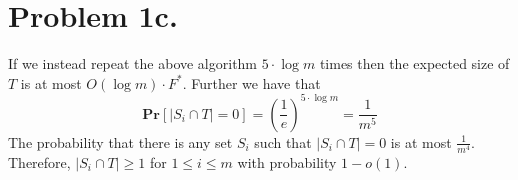 \documentclass[12pt]{article}
\begin{document}
\section*{Problem 1c.}
If we instead repeat the above algorithm $5 \cdot \log m$ times then the
expected size of $T$ is at most $O(\log m)\cdot F^*$. Further we have that
$$\textbf{Pr}[|S_i\cap T| = 0]
= \left(\frac{1}{e}\right)^{5\cdot \log m} = \frac{1}{m^5}$$
The probability that there is any set $S_i$ such that $|S_i\cap T| = 0$ is at
most $\frac{1}{m^4}$. Therefore, $|S_i\cap T| \ge 1$ for $1 \le i \le m$ with
probability $1-o(1)$.
\end{document}
